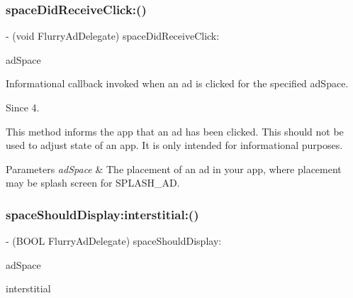 \subsubsection{\texorpdfstring{space\+Did\+Receive\+Click\+:()}{spaceDidReceiveClick:()}}
{\footnotesize\ttfamily -\/ (void Flurry\+Ad\+Delegate) space\+Did\+Receive\+Click\+: \begin{DoxyParamCaption}\item[{(N\+S\+String $\ast$)}]{ad\+Space }\end{DoxyParamCaption}\hspace{0.3cm}{\ttfamily [optional]}}



Informational callback invoked when an ad is clicked for the specified {\ttfamily ad\+Space}. 

\begin{DoxySince}{Since}
4.
\end{DoxySince}
This method informs the app that an ad has been clicked. This should not be used to adjust state of an app. It is only intended for informational purposes.


\begin{DoxyParams}{Parameters}
{\em ad\+Space} & The placement of an ad in your app, where placement may be splash screen for S\+P\+L\+A\+S\+H\+\_\+\+AD. \\
\hline
\end{DoxyParams}
\mbox{\label{protocolFlurryAdDelegate_01-p_a6d902e66617c05092d538de0fe9dbb07}} 
\subsubsection{\texorpdfstring{space\+Should\+Display\+:interstitial\+:()}{spaceShouldDisplay:interstitial:()}}
{\footnotesize\ttfamily -\/ (B\+O\+OL Flurry\+Ad\+Delegate) space\+Should\+Display\+: \begin{DoxyParamCaption}\item[{(N\+S\+String $\ast$)}]{ad\+Space }\item[{interstitial:(B\+O\+OL)}]{interstitial }\end{DoxyParamCaption}\hspace{0.3cm}{\ttfamily [optional]}}




